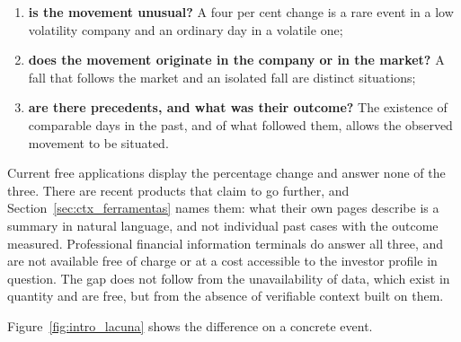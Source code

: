 \begin{enumerate}
  \item \textbf{is the movement unusual?} A four per cent change is a rare event in a low
        volatility company and an ordinary day in a volatile one;
  \item \textbf{does the movement originate in the company or in the market?} A fall that follows
        the market and an isolated fall are distinct situations;
  \item \textbf{are there precedents, and what was their outcome?} The existence of comparable
        days in the past, and of what followed them, allows the observed movement to be situated.
\end{enumerate}

Current free applications display the percentage change and answer none of the three. There are
recent products that claim to go further, and Section~\ref{sec:ctx_ferramentas} names them: what
their own pages describe is a summary in natural language, and not individual past cases with the
outcome measured. Professional financial information terminals do answer all three, and are
not available free of charge or at a cost accessible to the investor profile in question. The gap does not follow
from the unavailability of data, which exist in quantity and are free, but from the absence of
verifiable context built on them.

Figure~\ref{fig:intro_lacuna} shows the difference on a concrete event.

